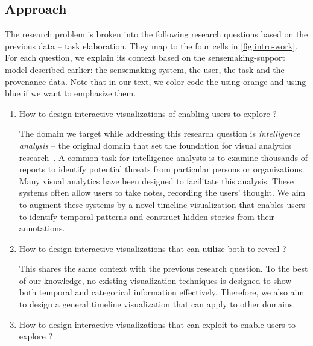 \subsection{Approach}
The research problem is broken into the following research questions based on the previous data -- task elaboration. They map to the four cells in \autoref{fig:intro-work}. For each question, we explain its context based on the sensemaking-support model described earlier: the sensemaking system, the user, the task and the provenance data. Note that in our text, we color code the  using orange and  using blue if we want to emphasize them.

\begin{enumerate}
	\item How to design interactive visualizations of  
	enabling users to explore ?
	
	The domain we target while addressing this research question is \emph{intelligence analysis} -- the original domain that set the foundation for visual analytics research~\cite{Thomas2005}. A common task for intelligence analysts is to examine thousands of reports to identify potential threats from particular persons or organizations. Many visual analytics have been designed to facilitate this analysis. These systems often allow users to take notes, recording the users' thought. We aim to augment these systems by a novel timeline visualization that enables users to identify temporal patterns and construct hidden stories from their annotations.
	
	\item How to design interactive visualizations that can utilize both  to reveal ?	
	
	This shares the same context with the previous research question. To the best of our knowledge, no existing visualization techniques is designed to show both temporal and categorical information effectively. Therefore, we also aim to design a general timeline visualization that can apply to other domains.
	
	\item How to design interactive visualizations that can exploit  to enable users to explore ?
	

\end{enumerate}
